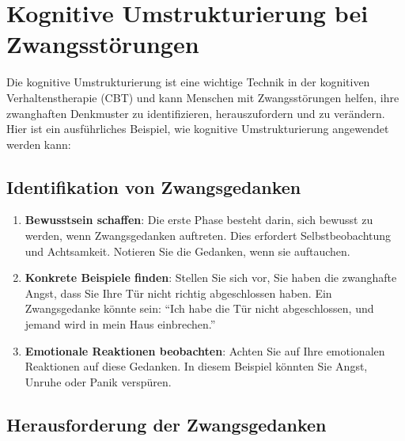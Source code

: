 
\section{Kognitive Umstrukturierung bei Zwangsstörungen}

Die kognitive Umstrukturierung ist eine wichtige Technik in der kognitiven Verhaltenstherapie (CBT) und kann Menschen mit Zwangsstörungen helfen, ihre zwanghaften Denkmuster zu identifizieren, herauszufordern und zu verändern. Hier ist ein ausführliches Beispiel, wie kognitive Umstrukturierung angewendet werden kann:

\subsection{Identifikation von Zwangsgedanken}

\begin{enumerate}
  \item \textbf{Bewusstsein schaffen}: Die erste Phase besteht darin, sich bewusst zu werden, wenn Zwangsgedanken auftreten. Dies erfordert Selbstbeobachtung und Achtsamkeit. Notieren Sie die Gedanken, wenn sie auftauchen.
  
  \item \textbf{Konkrete Beispiele finden}: Stellen Sie sich vor, Sie haben die zwanghafte Angst, dass Sie Ihre Tür nicht richtig abgeschlossen haben. Ein Zwangsgedanke könnte sein: \enquote{Ich habe die Tür nicht abgeschlossen, und jemand wird in mein Haus einbrechen.}
  
  \item \textbf{Emotionale Reaktionen beobachten}: Achten Sie auf Ihre emotionalen Reaktionen auf diese Gedanken. In diesem Beispiel könnten Sie Angst, Unruhe oder Panik verspüren.
\end{enumerate}

\subsection{Herausforderung der Zwangsgedanken}

